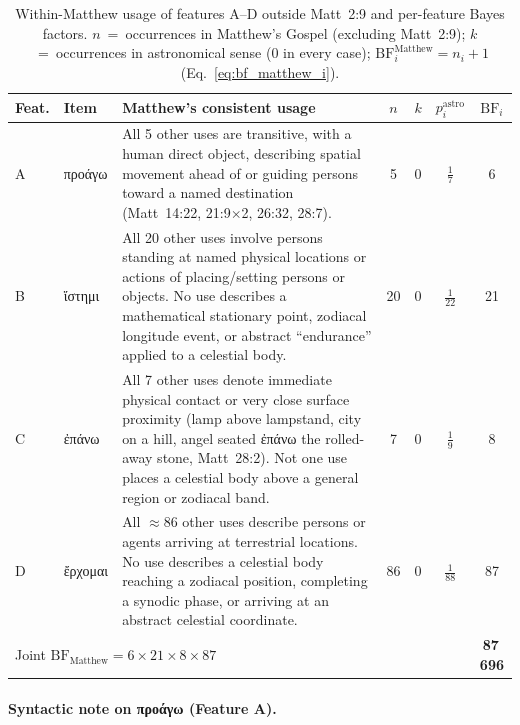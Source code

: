 \documentclass[11pt,a4paper]{article}
\newcommand{\grk}[1]{{\fontencoding{LGR}\selectfont #1}}
\newcommand{\grk}[1]{{\greekfont #1}}
\begin{document}
\begin{table}[h]
  \caption{Within-Matthew usage of features A--D outside Matt~2:9 and
    per-feature Bayes factors.
    $n$~=~occurrences in Matthew's Gospel (excluding Matt~2:9);
    $k$~=~occurrences in astronomical sense (0 in every case);
    $\mathrm{BF}_i^\text{Matthew} = n_i + 1$ (Eq.~\ref{eq:bf_matthew_i}).}
  \label{tab:within_matthew}
  \centering
  \small
  \begin{tabular}{@{}llp{4.4cm}cccc@{}}
    \toprule
    Feat. & Item & Matthew's consistent usage & $n$ & $k$ & $p_i^\text{astro}$ & $\mathrm{BF}_i$ \\
    \midrule
    A & \grk{προάγω} &
      All 5 other uses are transitive, with a human direct object,
      describing spatial movement ahead of or guiding persons toward a
      named destination (Matt~14:22, 21:9$\times$2, 26:32, 28:7). &
      5 & 0 & $\tfrac{1}{7}$ & 6 \\[6pt]
    B & \grk{ἵστημι} &
      All 20 other uses involve persons standing at named physical
      locations or actions of placing/setting persons or objects.
      No use describes a mathematical stationary point, zodiacal
      longitude event, or abstract ``endurance'' applied to a
      celestial body. &
      20 & 0 & $\tfrac{1}{22}$ & 21 \\[6pt]
    C & \grk{ἐπάνω} &
      All 7 other uses denote immediate physical contact or very close
      surface proximity (lamp above lampstand, city on a hill, angel
      seated \grk{ἐπάνω} the rolled-away stone, Matt~28:2).
      Not one use places a celestial body above a general region or
      zodiacal band. &
      7 & 0 & $\tfrac{1}{9}$ & 8 \\[6pt]
    D & \grk{ἔρχομαι} &
      All $\approx\!86$ other uses describe persons or agents arriving
      at terrestrial locations. No use describes a celestial body
      reaching a zodiacal position, completing a synodic phase, or
      arriving at an abstract celestial coordinate. &
      86 & 0 & $\tfrac{1}{88}$ & 87 \\
    \midrule
    \multicolumn{5}{l}{Joint $\mathrm{BF}_\text{Matthew} = 6\times21\times8\times87$} &
    & \textbf{87\,696} \\
    \bottomrule
  \end{tabular}
\end{table}

\paragraph{Syntactic note on \grk{προάγω} (Feature A).}
\end{document}
